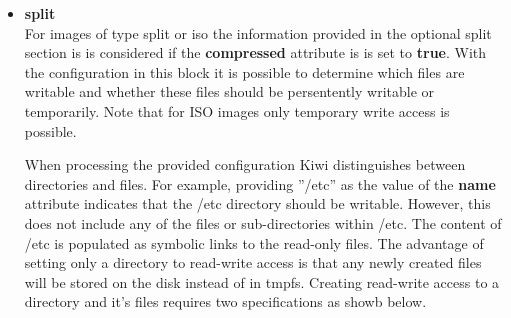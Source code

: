 \begin{itemize}
    Should the given size exceed the necessary size for the image Kiwi will
    not alter the image size as the free space might be required for proper
    execution of components within the image.

    If the size element is not used Kiwi will create an image with
    containing approxiamtely 30\% free space.
    
     
	\begin{Command}{12cm}
	<size unit="M">1000</size>
	\end{Command}

\item \textbf{split}\\
    For images of type split or iso the information provided in the optional
    split section is is considered if the \textbf{compressed} attribute is
    is set to \textbf{true}. With the configuration in this block it is
    possible to determine which files are writable and whether these files
    should be persentently writable or temporarily. Note that for ISO images
    only temporary write access is possible.

    When processing the provided configuration Kiwi distinguishes between
    directories and files. For example, providing ''/etc'' as the value of
    the \textbf{name} attribute indicates that the /etc directory should be
    writable. However, this does not include any of the files or 
    sub-directories within /etc. The content of /etc is populated as 
    symbolic links to the read-only files. The advantage of setting only a
    directory to read-write access is that any newly created files will be
    stored on the disk instead of in tmpfs. Creating read-write access to a 
    directory and it's files requires two specifications as showb below.


\end{itemize}
